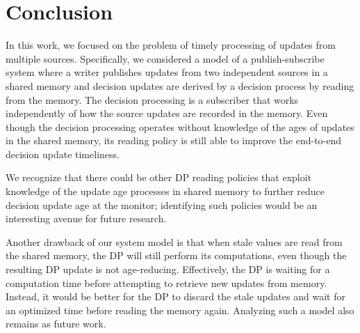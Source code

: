 \documentclass[conference, 10pt]{IEEEtran}
\newcommand{\maxage}{\hat{x}}
\newcommand{\dpage}{\hat{y}}
\newcommand{\V}[1]{\quad{\color{blue} #1}\quad}
\newcommand{\MOVE}[2][\mbox{}]{{\color{purple}MOVE: {\color{blue} #1}\ #2}\newline}
\begin{document}



\section{Conclusion}
\label{sec:conclusion}
In this work, we focused on the problem of
timely processing of updates from multiple sources.  
Specifically, we considered a model of a publish-subscribe system where a writer publishes updates from two independent sources in a shared memory and decision updates are derived by a decision process by reading from the memory. 
The decision processing is a subscriber that works independently of how the source updates are recorded in the memory. 
Even though the decision processing operates without knowledge of the ages of updates in the shared memory,
its reading policy is  still able to improve the end-to-end decision update timeliness.

We recognize that there could be other DP reading policies that exploit knowledge of the update age processes in shared memory to further reduce decision update age at the monitor;  identifying such policies 
would be an interesting avenue for future research.

Another drawback of our system model is  that when  stale values are read from the shared memory, the DP will still perform its computations, even though the resulting DP update is not age-reducing. Effectively, the DP is waiting for a computation time before attempting to retrieve new updates from memory. Instead, it would be better for the DP to discard the stale updates and wait for an optimized time before reading the memory again. Analyzing such a model also remains as future work. 
\end{document}
